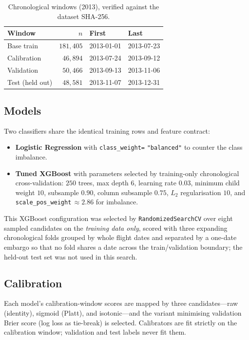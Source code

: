 \documentclass[conference]{IEEEtran}
\newcommand{\code}[1]{\texttt{#1}}
\begin{document}
\begin{table}[!t]
  \caption{Chronological windows (2013), verified against the dataset SHA-256.}
  \label{tab:windows}
  \centering
  \begin{tabular}{lrll}
    \toprule
    Window & $n$ & First & Last \\
    \midrule
    Base train        & $181{,}405$ & 2013-01-01 & 2013-07-23 \\
    Calibration        & $46{,}894$  & 2013-07-24 & 2013-09-12 \\
    Validation         & $50{,}466$  & 2013-09-13 & 2013-11-06 \\
    Test (held out)    & $48{,}581$  & 2013-11-07 & 2013-12-31 \\
    \bottomrule
  \end{tabular}
\end{table}

\subsection{Models}
Two classifiers share the identical training rows and feature contract:
\begin{itemize}
  \item \textbf{Logistic Regression} with \code{class\_weight=} \code{"balanced"}
  to counter the class imbalance.
  \item \textbf{Tuned XGBoost} with parameters selected by training-only
  chronological cross-validation: $250$ trees, max depth $6$, learning rate
  $0.03$, minimum child weight $10$, subsample $0.90$, column subsample $0.75$,
  $L_2$ regularisation $10$, and \code{scale\_pos\_weight}$\,\approx 2.86$ for
  imbalance.
\end{itemize}
This XGBoost configuration was selected by \code{RandomizedSearchCV} over eight
sampled candidates on the \emph{training data only}, scored with three expanding
chronological folds grouped by whole flight dates and separated by a one-date
embargo so that no fold shares a date across the train/validation boundary; the
held-out test set was not used in this search.

\subsection{Calibration}
Each model's calibration-window scores are mapped by three candidates---raw
(identity), sigmoid (Platt), and isotonic---and the variant minimising validation
Brier score (log loss as tie-break) is selected. Calibrators are fit strictly on
the calibration window; validation and test labels never fit them.
\end{document}
